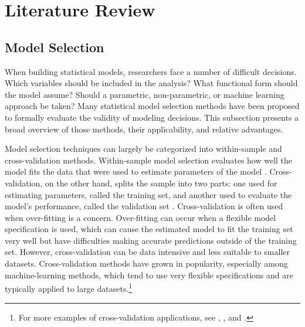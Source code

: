 \documentclass[twocolumn]{article}
\begin{document}
\section{Literature Review}

\subsection{Model Selection}
\label{sec:ModelSelection}

When building statistical models, researchers face a number of difficult decisions. Which variables should be included in the analysis? What functional form should the model assume? Should a parametric, non-parametric, or machine learning approach be taken? Many statistical model selection methods have been proposed to formally evaluate the validity of modeling decisions. This subsection presents a broad overview of those methods, their applicability, and relative advantages.

Model selection techniques can largely be categorized into within-sample and cross-validation methods. Within-sample model selection evaluates how well the model fits the data that were used to estimate parameters of the model \citep{Greene}. Cross-validation, on the other hand, splits the sample into two parts: one used for estimating parameters, called the training set, and another used to evaluate the model's performance, called the validation set \citep{Arlot}. Cross-validation is often used when over-fitting is a concern. Over-fitting can occur when a flexible model specification is used, which can cause the estimated model to fit the training set very well but have difficulties making accurate predictions outside of the training set. However, cross-validation can be data intensive and less suitable to smaller datasets. Cross-validation methods have grown in popularity, especially among machine-learning methods, which tend to use very flexible specifications and are typically applied to large datasets.\footnote{For more examples of cross-validation applications, see \cite{Allen}, \cite{Golub}, and \cite{Kohavi}.}
\end{document}

